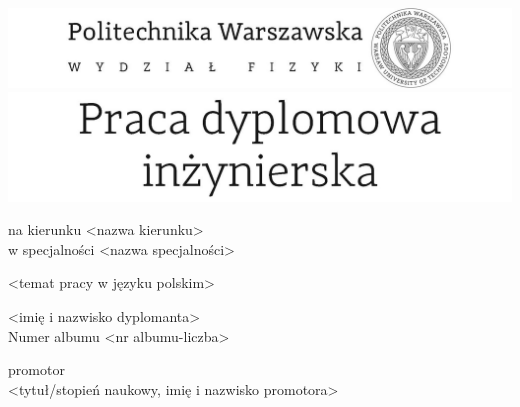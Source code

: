 

\graphicspath{{LogosPW/}}


\thispagestyle{empty}
\center
\includegraphics[scale=1]{logo.jpg}
\center
\includegraphics[scale=1]{praca_dyplomowa.jpg}

\vspace{17mm}

\normalsize
na kierunku <nazwa kierunku> \\ %
w specjalności <nazwa specjalności> \\ %

\vspace{15mm}

\Large 
<temat pracy w języku polskim>  \\ %

\vspace{17mm}

\huge 
<imię i nazwisko dyplomanta>  \\ %
\normalsize 
Numer albumu <nr albumu-liczba> \\ %

\vspace{17mm}

promotor \\
<tytuł/stopień naukowy, imię i nazwisko promotora> \\ %


